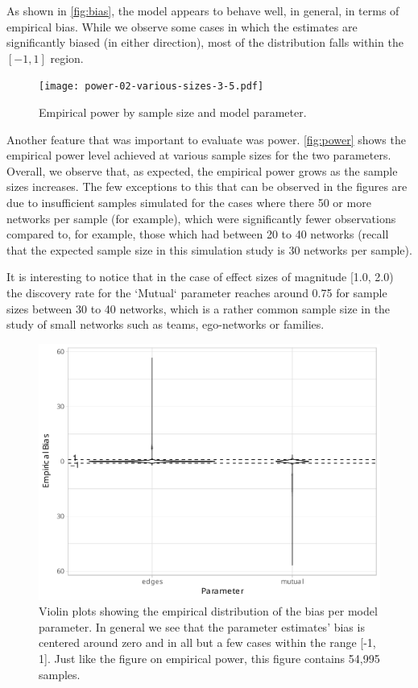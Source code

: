 \documentclass[12pt]{article}
\begin{document}
As shown in \autoref{fig:bias}, the model appears to behave well, in general, in terms of empirical bias. While we observe some cases in which the estimates are significantly biased (in either direction), most of the distribution falls within the $[-1,1]$ region.

\begin{figure}
	\centering
	\caption{\label{fig:power}Empirical power by sample size and model parameter.}
	\texttt{[image: power-02-various-sizes-3-5.pdf]}
\end{figure}

Another feature that was important to evaluate was power. \autoref{fig:power} shows the empirical power level achieved at various sample sizes for the two parameters. Overall, we observe that, as expected, the empirical power grows as the sample sizes increases. The few exceptions to this that can be observed in the figures are due to insufficient samples simulated for the cases where there 50 or more networks per sample (for example), which were significantly fewer observations compared to, for example, those which had between 20 to 40 networks (recall that the expected sample size in this simulation study is 30 networks per sample).

It is interesting to notice that in the case of effect sizes of magnitude [1.0, 2.0) the discovery rate for the `Mutual` parameter reaches around 0.75 for sample sizes between 30 to 40 networks, which is a rather common sample size in the study of small networks such as teams, ego-networks or families.

\begin{figure}
    \centering
    \caption{\label{fig:bias}Violin plots showing the empirical distribution of the bias per model parameter. In general we see that the parameter estimates' bias is centered around zero and in all but a few cases within the range [-1, 1]. Just like the figure on empirical power, this figure contains 54,995 samples.}
    \includegraphics[width=.8\linewidth]{figures/bias-02-various-sizes-3-5.pdf}
\end{figure}
\end{document}

